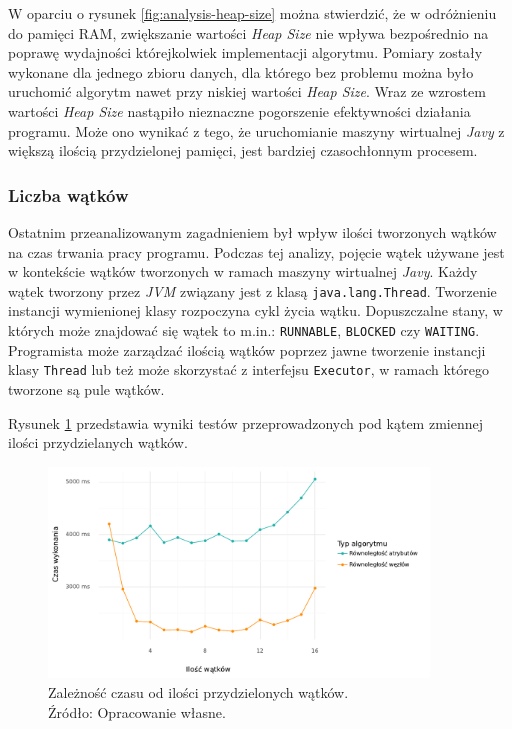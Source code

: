 \documentclass[12pt]{article}
\begin{document}
W oparciu o rysunek \ref{fig:analysis-heap-size} można stwierdzić, że w odróżnieniu do pamięci RAM,
zwiększanie wartości \textit{Heap Size} nie wpływa bezpośrednio na poprawę wydajności którejkolwiek implementacji algorytmu.
Pomiary zostały wykonane dla jednego zbioru danych, dla którego bez problemu można było uruchomić algorytm nawet
przy niskiej wartości \textit{Heap Size}. Wraz ze wzrostem wartości \textit{Heap Size} nastąpiło nieznaczne pogorszenie efektywności działania programu. 
Może ono wynikać z tego, że uruchomianie maszyny wirtualnej \textit{Javy} z większą ilością przydzielonej pamięci, jest bardziej czasochłonnym procesem.

\subsubsection{Liczba wątków}
Ostatnim przeanalizowanym zagadnieniem był wpływ ilości tworzonych wątków na czas trwania
pracy programu. Podczas tej analizy, pojęcie wątek używane jest w kontekście wątków
tworzonych w ramach maszyny wirtualnej \textit{Javy}. Każdy wątek tworzony przez \textit{JVM} związany jest
z klasą \verb|java.lang.Thread|. Tworzenie instancji wymienionej klasy rozpoczyna cykl życia wątku.
Dopuszczalne stany, w których może znajdować się wątek to m.in.: \verb|RUNNABLE|, 
\verb|BLOCKED| czy \verb|WAITING|. Programista może zarządzać ilością wątków poprzez jawne tworzenie instancji
klasy \verb|Thread| lub też może skorzystać z interfejsu \verb|Executor|, w ramach którego tworzone są pule wątków.

Rysunek \ref{fig:analysis-threads} przedstawia wyniki testów przeprowadzonych pod kątem zmiennej
ilości przydzielanych wątków.

\begin{figure}[H]
    \centering
	\includegraphics[width=0.9\textwidth]{analysis-threads.pdf}
    \caption{Zależność czasu od ilości przydzielonych wątków.\\Źródło: Opracowanie własne.}
    \label{fig:analysis-threads}
\end{figure}
\end{document}

